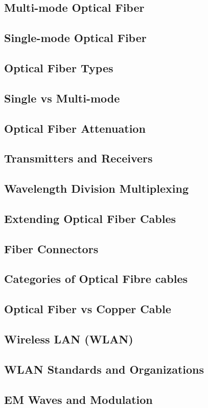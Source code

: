 \documentclass[11pt]{article}
\begin{document}
\subsection{Multi-mode Optical Fiber}
\subsection{Single-mode Optical Fiber}
\subsection{Optical Fiber Types}
\subsection{Single vs Multi-mode}
\subsection{Optical Fiber Attenuation}
\subsection{Transmitters and Receivers}
\subsection{Wavelength Division Multiplexing}
\subsection{Extending Optical Fiber Cables}
\subsection{Fiber Connectors}
\subsection{Categories of Optical Fibre cables}
\subsection{Optical Fiber vs Copper Cable}
\subsection{Wireless LAN (WLAN)}
\subsection{WLAN Standards and Organizations}
\subsection{EM Waves and Modulation}
\end{document}
